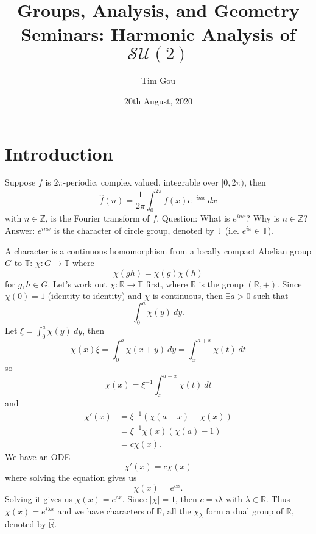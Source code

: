 \documentclass{article}
\author{Tim Gou}
\title{\textbf{Groups, Analysis, and Geometry Seminars}: Harmonic Analysis of $\mathcal{SU}(2)$}
\date{20th August, 2020}
\begin{document}
\maketitle

\section{Introduction} 

Suppose $f$ is $2\pi$-periodic, complex valued, integrable over $[0, 2\pi)$, then
\begin{equation}
    \widehat{f}(n) = \frac{1}{2\pi} \int^{2\pi}_{0} f(x) e^{-inx} \ dx
\end{equation}
with $n \in \mathbb{Z}$, is the Fourier transform of $f$. Question: What is $e^{inx}$? Why is $n \in \mathbb{Z}$? Answer: $e^{inx}$ is the character of circle group, denoted by $\mathbb{T}$ (i.e. $e^{ix} \in \mathbb{T}$).

A character is a continuous homomorphism from a locally compact Abelian group $G$ to $\mathbb{T}$: $ \chi : G \rightarrow \mathbb{T} $
where
\begin{equation}
    \chi(gh) = \chi(g)\chi(h)
\end{equation}
for $g,h \in G$. Let's work out $\chi : \mathbb{R} \rightarrow \mathbb{T}$ first, where $\mathbb{R}$ is the group $(\mathbb{R}, +)$. Since $\chi(0)=1$ (identity to identity) and $\chi$ is continuous, then $\exists a > 0$ such that
\begin{equation}
    \int^{a}_{0} \chi(y) \ dy.
\end{equation}
Let $\xi = \int^{a}_{0} \chi(y) \ dy$, then 
\begin{equation}
    \chi(x)\xi = \int^{a}_{0} \chi(x+y) \ dy = \int^{a+x}_{x} \chi(t) \ dt
\end{equation} 
so
\begin{equation}
    \chi(x) = \xi^{-1} \int^{a+x}_{x} \chi(t) \ dt
\end{equation}
and
\begin{equation}
    \begin{split}
        \chi'(x) &= \xi^{-1} \left(\chi(a+x) - \chi(x) \right) \\
                 &= \xi^{-1} \chi(x) \left(\chi(a) - 1\right) \\
                 &= c \chi(x).
    \end{split}
\end{equation}
We have an ODE
\begin{equation}
    \chi'(x) = c \chi(x)
\end{equation}
where solving the equation gives us
\begin{equation}
    \chi(x) = e^{cx}.
\end{equation}
Solving it gives us $\chi(x) = e^{cx}$. Since $| \chi | = 1$, then $c=i\lambda$ with $\lambda \in \mathbb{R}$. Thus $\chi(x) = e^{i\lambda x}$ and we have characters of $\mathbb{R}$, all the $\chi_{\lambda}$ form a dual group of $\mathbb{R}$, denoted by $\widehat{\mathbb{R}}$. 
\end{document}
